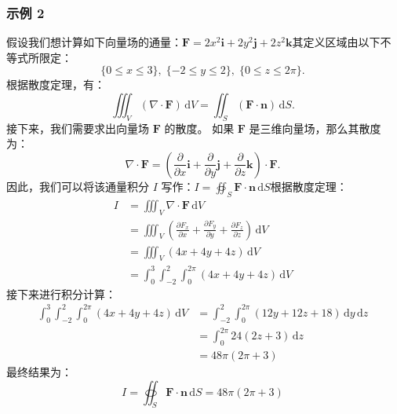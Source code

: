 \subsubsection{示例 2}
假设我们想计算如下向量场的通量：$\mathbf{F} = 2x^2\mathbf{i} + 2y^2\mathbf{j} + 2z^2\mathbf{k}$其定义区域由以下不等式所限定：
$$
\{0 \leq x \leq 3\},\;\{-2 \leq y \leq 2\},\;\{0 \leq z \leq 2\pi\}.~
$$
根据散度定理，有：
$$
\iiint_{V} \left(\nabla \cdot \mathbf{F}\right)\,\mathrm{d}V
= 
\iint_{S} 
(\mathbf{F} \cdot \mathbf{n})\,\mathrm{d}S.~
$$
接下来，我们需要求出向量场 $\mathbf{F}$ 的散度。
如果 $\mathbf{F}$ 是三维向量场，那么其散度为：
$$
\nabla \cdot \mathbf{F}
=
\left(
\frac{\partial}{\partial x}\mathbf{i}
+ 
\frac{\partial}{\partial y}\mathbf{j}
+ 
\frac{\partial}{\partial z}\mathbf{k}
\right)
\cdot
\mathbf{F}.~
$$
因此，我们可以将该通量积分 $I$ 写作：$I = \oiint_{S} \mathbf{F} \cdot \mathbf{n} \,\mathrm{d}S$根据散度定理：
$$
\begin{aligned}
I &= \iiint_{V} \nabla \cdot \mathbf{F} \,\mathrm{d}V \\[6pt]
  &= \iiint_{V} \left(\frac{\partial F_x}{\partial x} + \frac{\partial F_y}{\partial y} + \frac{\partial F_z}{\partial z}\right)\,\mathrm{d}V \\[6pt]
  &= \iiint_{V} (4x + 4y + 4z)\,\mathrm{d}V \\[6pt]
  &= \int_{0}^{3} \int_{-2}^{2} \int_{0}^{2\pi} (4x + 4y + 4z)\,\mathrm{d}V
\end{aligned}~
$$
接下来进行积分计算：
$$
\begin{aligned}
\int_{0}^{3} \int_{-2}^{2} \int_{0}^{2\pi} (4x + 4y + 4z)\,\mathrm{d}V
&= \int_{-2}^{2} \int_{0}^{2\pi} (12y + 12z + 18)\,\mathrm{d}y\,\mathrm{d}z \\[6pt]
&= \int_{0}^{2\pi} 24(2z + 3)\,\mathrm{d}z \\[6pt]
&= 48\pi (2\pi + 3)
\end{aligned}~
$$
最终结果为：
$$
\boxed{
I = \oiint_{S} \mathbf{F} \cdot \mathbf{n} \,\mathrm{d}S
= 48\pi (2\pi + 3)}~
$$
